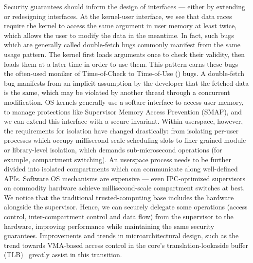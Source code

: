 Security guarantees should inform the design of interfaces --- either by 
extending or redesigning interfaces.
% 
At the kernel-user interface, we see that data races require the kernel
to access the same argument in user memory at least twice, which
allows the user to modify the data in the meantime.
In fact, such bugs which are generally called double-fetch bugs commonly 
manifest from the same usage pattern.
The kernel first loads arguments once to check their validity, then
loads them at a later time in order to use them.
This pattern earns these bugs the often-used moniker of 
Time-of-Check to Time-of-Use (\tocttou) bugs.
A double-fetch bug manifests from an implicit assumption by the developer
that the fetched data is the same, which may be violated by another thread
through a concurrent modification.
OS kernels generally use a softare interface to access user memory, to manage
protections like Supervisor Memory Access Prevention (SMAP), and we can
extend this interface with a secure invariant.
% 
Within userspace, however, the requirements for isolation have changed 
drastically: from isolating per-user processes which occupy millisecond-scale
scheduling slots to finer grained module or library-level isolation, which
demands sub-microsecond operations (for example, compartment switching).
An userspace process needs to be further divided into isolated compartments
which can communicate along well-defined APIs.
Software OS mechanisms are expensive --- even IPC-optimized supervisors
on commodity hardware achieve millisecond-scale compartment switches at
best.
We notice that the traditional trusted-computing base includes the hardware
alongside the supervisor.
Hence, we can securely delegate some operations (access control, inter-compartment
control and data flow) from the supervisor to the hardware, improving 
performance while maintaining the same security guarantees.
Improvements and trends in microarchitectural design, such as the trend towards
VMA-based access control in the core's translation-lookaside buffer 
(TLB)~\cite{0003BOBFP21midgard} greatly assist in this transition.


